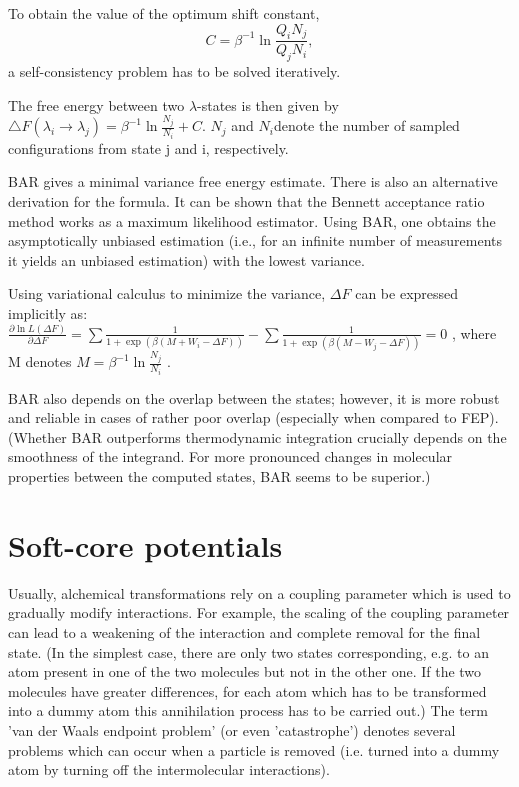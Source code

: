 To obtain the value of the optimum shift constant,
\[
C=\beta^{-1}\ln\frac{Q_{i}N_{j}}{Q_{j}N_{i}},
\]
a self-consistency
problem has to be solved iteratively\cite{Gapsys.2015}.

The free energy between two $\lambda$-states is then given by $\bigtriangleup F\left(\lambda_{i}\rightarrow\lambda_{j}\right)=\beta^{-1}\ln\frac{N_{j}}{N_{i}}+C$\cite{Bruckner.2011}.
$N_{j}$ and $N_{i}$denote the number of sampled configurations from
state j and i, respectively.

BAR gives a minimal variance free energy estimate. There is also an
alternative derivation for the formula. It can be shown that the
Bennett acceptance ratio method works as a maximum likelihood estimator.
Using BAR, one obtains the asymptotically unbiased estimation (i.e., for an infinite
number of measurements it yields an unbiased estimation) 
with the lowest variance\cite{Shirts.2003}. 

Using variational calculus to minimize the variance, $\Delta F$ can
be expressed implicitly as:$\frac{\partial\ln L\left(\Delta F\right)}{\partial\Delta F}=\sum\frac{1}{1+\exp\left(\beta\left(M+W_{i}-\Delta F\right)\right)}-\sum\frac{1}{1+\exp\left(\beta\left(M-W_{j}-\Delta F\right)\right)}=0$
, where M denotes $M=\beta^{-1}\ln\frac{N_{j}}{N_{i}}$ \cite{Shirts.2003}.

BAR also depends on the overlap between the states; however, it is
more robust and reliable in cases of rather poor overlap \cite{Ruiter.2013}
(especially when compared to FEP). (Whether BAR outperforms thermodynamic
integration crucially depends on the smoothness of the integrand.
For more pronounced changes in molecular properties between the computed
states, BAR seems to be superior\cite{Shirts.2013}.)

\section{Soft-core potentials}

Usually, alchemical transformations rely on a coupling parameter which
is used to gradually modify interactions. For example, the scaling of the coupling parameter can lead to a weakening of the interaction and complete removal for the final state. (In the simplest case,
there are only two states corresponding, e.g. to an atom present in
one of the two molecules but not in the other one. If the two molecules
have greater differences, for each atom which has to be transformed
into a dummy atom this annihilation process has to be carried out.)
The term 'van der Waals endpoint problem' (or even 'catastrophe') denotes
several problems which can occur when a particle is removed (i.e.
turned into a dummy atom by turning off the intermolecular interactions).
\cite{Boresch.2011}

